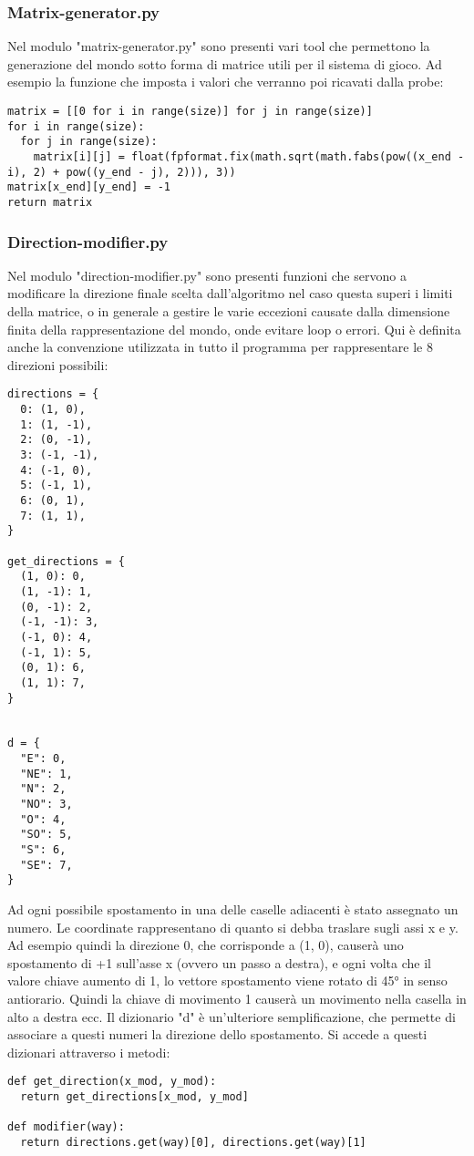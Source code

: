 \subsubsection{Matrix-generator.py}
Nel modulo "matrix-generator.py" sono presenti vari tool che permettono la generazione del mondo sotto forma di matrice utili per il sistema di gioco. Ad esempio la funzione che imposta i valori che verranno poi ricavati dalla probe:
\begin{verbatim}
matrix = [[0 for i in range(size)] for j in range(size)]
for i in range(size):
  for j in range(size):
    matrix[i][j] = float(fpformat.fix(math.sqrt(math.fabs(pow((x_end - i), 2) + pow((y_end - j), 2))), 3))
matrix[x_end][y_end] = -1
return matrix
\end{verbatim}

\subsubsection{Direction-modifier.py}
Nel modulo "direction-modifier.py" sono presenti funzioni che servono a modificare la direzione finale scelta dall'algoritmo nel caso questa superi i limiti della matrice, o in generale a gestire le varie eccezioni causate dalla dimensione finita della rappresentazione del mondo, onde evitare loop o errori. Qui è definita anche la convenzione utilizzata in tutto il programma per rappresentare le 8 direzioni possibili:
\begin{verbatim}
directions = {
  0: (1, 0),
  1: (1, -1),
  2: (0, -1),
  3: (-1, -1),
  4: (-1, 0),
  5: (-1, 1),
  6: (0, 1),
  7: (1, 1),
}

get_directions = {
  (1, 0): 0,
  (1, -1): 1,
  (0, -1): 2,
  (-1, -1): 3,
  (-1, 0): 4,
  (-1, 1): 5,
  (0, 1): 6,
  (1, 1): 7,
}


d = {
  "E": 0,
  "NE": 1,
  "N": 2,
  "NO": 3,
  "O": 4,
  "SO": 5,
  "S": 6,
  "SE": 7,
}
\end{verbatim}

Ad ogni possibile spostamento in una delle caselle adiacenti è stato assegnato un numero. Le coordinate rappresentano di quanto si debba traslare sugli assi x e y. Ad esempio quindi la direzione 0, che corrisponde a (1, 0), causerà uno spostamento di +1 sull'asse x (ovvero un passo a destra), e ogni volta che il valore chiave aumento di 1, lo vettore spostamento viene rotato di 45° in senso antiorario. Quindi la chiave di movimento 1 causerà un movimento nella casella in alto a destra ecc. Il dizionario "d" è un'ulteriore semplificazione, che permette di associare a questi numeri la direzione dello spostamento. Si accede a questi dizionari attraverso i metodi:
\begin{verbatim}
def get_direction(x_mod, y_mod):
  return get_directions[x_mod, y_mod]

def modifier(way):
  return directions.get(way)[0], directions.get(way)[1]

\end{verbatim}

